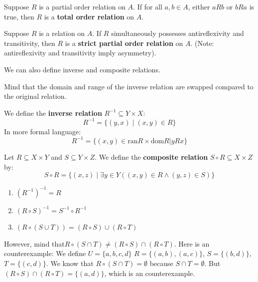 \begin{definition}
Suppose $R$ is a partial order relation on $A$. If for all $a, b \in A$, either $aRb$ or $bRa$ is true, then $R$ is a \textbf{total order relation} on $A$.
\end{definition}

\begin{definition}
Suppose $R$ is a relation on $A$. If $R$ simultaneously possesses antireflexivity and transitivity, then $R$ is a \textbf{strict partial order relation} on $A$. (Note: antireflexivity and transitivity imply asymmetry).
\end{definition}

We can also define inverse and composite relations.

Mind that the domain and range of the inverse relation are swapped compared to the original relation.

\begin{definition}
We define the \textbf{inverse relation} $R^{-1} \subseteq Y \times X$:
$$ R^{-1} = \{ (y,x) \mid (x,y) \in R \} $$
In more formal language:
\[
R^{-1} = \{(x,y) \in \text{ran}R \times \text{dom}R | yRx\}
\]
\end{definition}

\begin{definition}
Let $R \subseteq X \times Y$ and $S \subseteq Y \times Z$. We define the \textbf{composite relation} $S \circ R \subseteq X \times Z$ by:
$$ S \circ R = \{ (x,z) \mid \exists y \in Y ((x,y) \in R \wedge (y,z) \in S) \} $$
\end{definition}
\begin{theorem}
\begin{enumerate}
    \item $(R^{-1})^{-1} = R$
    \item $(R \circ S)^{-1} = S^{-1} \circ R^{-1}$
    \item $(R \circ (S \cup T)) = (R \circ S) \cup (R \circ T)$
\end{enumerate}
\end{theorem}
However, mind that$R \circ (S \cap T) \neq (R \circ S) \cap (R \circ T)$.
Here is an counterexample:
We define $U=\{a,b,c,d\}$ $R=\{(a,b),(a,c)\}$, $S=\{(b,d)\}$, $T=\{(c,d)\}$.
We know that $R \circ (S \cap T)  = \emptyset$ because $S \cap T = \emptyset$. But $(R \circ S) \cap (R \circ T) = \{(a,d)\}$, which is an counterexample.

